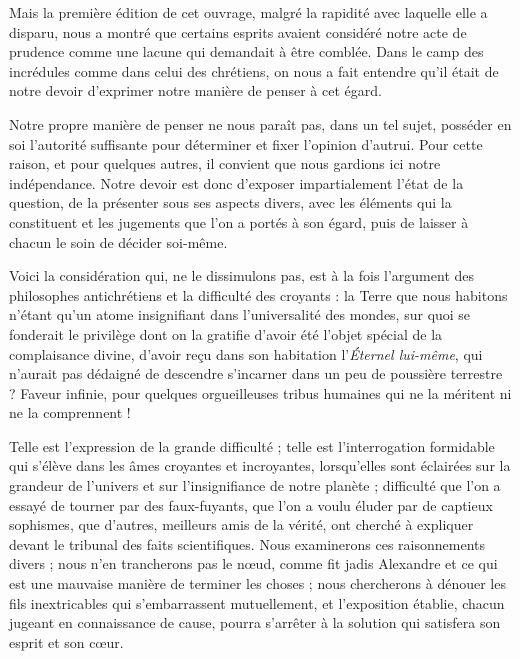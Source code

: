 \documentclass[a4paper, 11pt, oneside, landscape]{article}
\begin{document}
Mais la première édition de cet ouvrage, malgré la rapidité avec laquelle elle a disparu, nous a montré que certains esprits avaient considéré notre acte de prudence comme une lacune qui demandait à être comblée. Dans le camp des incrédules comme dans celui des chrétiens, on nous a fait entendre qu'il était de notre devoir d'exprimer notre manière de penser à cet égard.

Notre propre manière de penser ne nous paraît pas, dans un tel sujet, posséder en soi l'autorité suffisante pour déterminer et fixer l'opinion d'autrui. Pour cette raison, et pour quelques autres, il convient que nous gardions ici notre indépendance. Notre devoir est donc d'exposer impartialement l'état de la question, de la présenter sous ses aspects divers, avec les éléments qui la constituent et les jugements que l'on a portés à son égard, puis de laisser à chacun le soin de décider soi-même.

Voici la considération qui, ne le dissimulons pas, est à la fois l'argument des philosophes antichrétiens et la difficulté des croyants : la Terre que nous habitons n'étant qu'un atome insignifiant dans l'universalité des mondes, sur quoi se fonderait le privilège dont on la gratifie d'avoir été l'objet spécial de la complaisance divine, d'avoir reçu dans son habitation l'\emph{Éternel lui-même}, qui n'aurait pas dédaigné de descendre s'incarner dans un peu de poussière terrestre ? Faveur infinie, pour quelques orgueilleuses tribus humaines qui ne la méritent ni ne la comprennent !

Telle est l'expression de la grande difficulté ; telle est l'interrogation formidable qui s'élève dans les âmes croyantes et incroyantes, lorsqu'elles sont éclairées sur la grandeur de l'univers et sur l'insignifiance de notre planète ; difficulté que l'on a essayé de tourner par des faux-fuyants, que l'on a voulu éluder par de captieux sophismes, que d'autres, meilleurs amis de la vérité, ont cherché à expliquer devant le tribunal des faits scientifiques. Nous examinerons ces raisonnements divers ; nous n'en trancherons pas le nœud, comme fit jadis Alexandre et ce qui est une mauvaise manière de terminer les choses ; nous chercherons à dénouer les fils inextricables qui s'embarrassent mutuellement, et l'exposition établie, chacun jugeant en connaissance de cause, pourra s'arrêter à la solution qui satisfera son esprit et son cœur.
\end{document}

